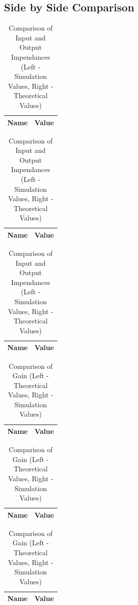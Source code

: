 \subsection{Side by Side Comparison}
\begin{table}[H]
  \begin{tabular}{|l|r|}
    \hline    
    {\bf Name} & {\bf Value} \\ \hline
    
  \end{tabular}
  \begin{tabular}{|l|c|}
    \hline
    {\bf Name} & {\bf Value} \\ \hline
    
  \end{tabular}
  \begin{tabular}{|l|c|}
    \hline
    {\bf Name} & {\bf Value} \\ \hline
    
  \end{tabular}
    \caption{Comparison of Input and Output Impendances (Left - Simulation Values, Right - Theoretical Values)}
    \label{tab:comp1}
\end{table}

\begin{table}[H]
    \begin{tabular}{|l|c|}
    \hline
    {\bf Name} & {\bf Value} \\ \hline
    
  \end{tabular}
  \begin{tabular}{|l|r|}
    \hline    
    {\bf Name} & {\bf Value} \\ \hline
    
  \end{tabular}
  \begin{tabular}{|l|c|}
    \hline
    {\bf Name} & {\bf Value} \\ \hline
    
  \end{tabular}
    \caption{Comparison of Gain (Left - Theoretical Values, Right - Simulation Values)}
    \label{tab:comp2}
\end{table}

